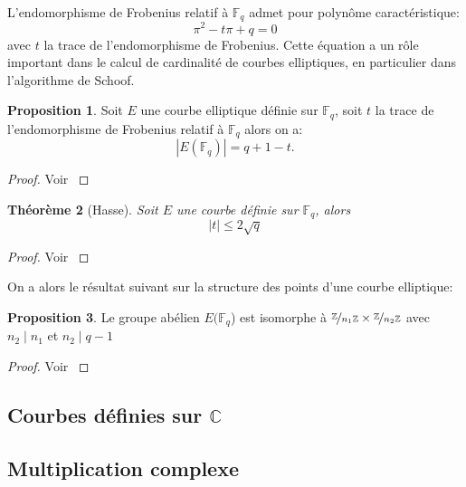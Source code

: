 \documentclass[10pt,a4paper]{book}
\theoremstyle{plain}
\newtheorem{thm}{Théorème}
\theoremstyle{definition}
\theoremstyle{definition}
\theoremstyle{definition}
\newtheorem{prop}[thm]{Proposition}
\theoremstyle{definition}
\theoremstyle{remark}
\theoremstyle{remark}
\begin{document}
L'endomorphisme de Frobenius relatif à $\mathbb{F}_q$ admet pour polynôme caractéristique:
\begin{equation}
\pi^2-t\pi+q=0
\end{equation}
avec $t$ la trace de l'endomorphisme de Frobenius. Cette équation a un rôle important dans le calcul de cardinalité de courbes elliptiques, en particulier dans l'algorithme de Schoof.

\begin{prop}
Soit $E$ une courbe elliptique définie sur $\mathbb{F}_q$, soit $t$ la trace de l'endomorphisme de Frobenius relatif à $ \mathbb{F}_q$ alors on a:
\begin{equation*}
|E(\mathbb{F}_q)|=q+1-t.
\end{equation*}
\end{prop}

\begin{proof}
Voir \cite[Theorem V.1.1]{Silv1}
\end{proof}

\begin{thm}[Hasse]
Soit $E$ une courbe définie sur $\mathbb{F}_q$, alors 
\begin{equation}
|t| \leqslant 2 \sqrt{q}
\end{equation}
\end{thm}

\begin{proof}
Voir \cite[Theorem V.1.1]{Silv1}
\end{proof}

On a alors le résultat suivant sur la structure des points d'une courbe elliptique:

\begin{prop}
Le groupe abélien $E(\mathbb{F}_q$) est isomorphe à $\nicefrac{\mathbb{Z}}{n_1 \mathbb{Z}} \times \nicefrac{\mathbb{Z}}{n_2 \mathbb{Z}}$ avec $n_2 \mid n_1$ et $n_2 \mid q-1$
\end{prop}

\begin{proof}
Voir \cite[Theorem 4.1]{Washington:2008}
\end{proof}



\subsection{Courbes définies sur $\mathbb{C}$}
\subsection{Multiplication complexe}
\end{document}

